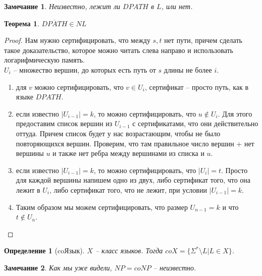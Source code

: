 \documentclass[12pt, letterpaper]{article}
\newtheorem{theorem}{Теорема}[section]
\newtheorem{defi}{Определение}[section]
\newtheorem{note}{Замечание}[section]
\begin{document}
\begin{note}
Неизвестно, лежит ли $DPATH$ в $L$, или нет.
\end{note}

\begin{theorem}
$\overline{DPATH} \in NL$
\end{theorem}

\begin{proof}
Нам нужно сертифицировать, что между $s, t$ нет пути, причем сделать такое доказательство, которое можно читать слева направо и использовать логарифмическую память. \\
$U_i$ -- множество вершин, до которых есть путь от $s$ длины не более $i$. \\  
\begin{enumerate}
\item для $v$ можно сертифицировать, что $v \in U_i$, сертификат -- просто путь, как в языке $DPATH$.
\item если известно $|U_{i-1}|=k$, то можно сертифицировать, что $u \notin U_i$. Для этого предоставим список вершин из $U_{i-1}$ с сертификатами, что они действительно оттуда. Причем список будет у нас возрастающим, чтобы не было повторяющихся вершин. Проверим, что там правильное число вершин + нет вершины $u$ и также нет ребра между вершинами из списка и $u$. 
\item если известно $|U_{i-1}|=k$, то можно сертифицировать, что $|U_i| = t$. Просто для каждой вершины напишем одно из двух, либо сертификат того, что она лежит в $U_{i}$, либо сертификат того, что не лежит, при условии $|U_{i-1}|=k$.
\item Таким образом мы можем сертифицировать, что размер $U_{n-1}=k$ и что $t \notin U_n$. 
\end{enumerate}
\end{proof}

\begin{defi}[coЯзык]
$X$ -- класс языков. Тогда $coX = \{ \Sigma^* \setminus L | L \in X \}$. 
\end{defi}

\begin{note}
Как мы уже видели, $NP = coNP$ -- неизвестно.
\end{note}
\end{document}
